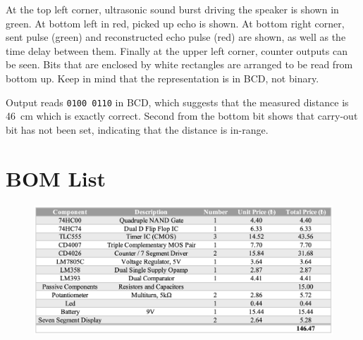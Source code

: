 \documentclass[12pt, a4paper]{article}
\begin{document}
            At the top left corner, ultrasonic sound burst driving the speaker is shown in green. At bottom left in red, picked up echo is shown. At bottom right corner, sent pulse (green) and reconstructed echo pulse (red) are shown, as well as the time delay between them. Finally at the upper left corner, counter outputs can be seen. Bits that are enclosed by white rectangles are arranged to be read from bottom up. Keep in mind that the representation is in BCD, not binary. 

            Output reads \texttt{0100 0110} in BCD, which suggests that the measured distance is \SI{46}{\centi\metre} which is exactly correct. Second from the bottom bit shows that carry-out bit has not been set, indicating that the distance is in-range. 

            \bigskip
            
            \begin{figure}[H]\centering
                    \caption[]{}
            \end{figure}

            
    \pagebreak
    \section{BOM List}
        \begin{figure}[H]\centering
            \includegraphics[width = \textwidth]{bom.png}
        \end{figure}
\end{document}
